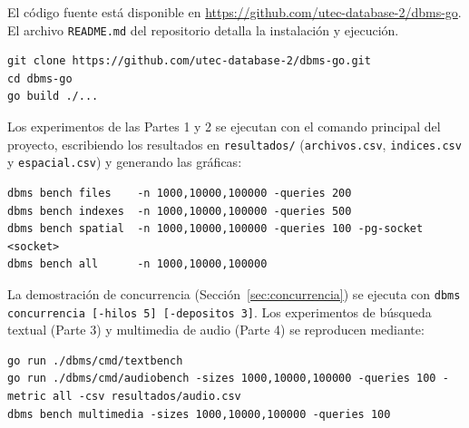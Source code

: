 \documentclass[11pt,a4paper]{article}
\begin{document}
El código fuente está disponible en \url{https://github.com/utec-database-2/dbms-go}. El archivo \texttt{README.md} del repositorio detalla la instalación y ejecución.

\begin{lstlisting}
git clone https://github.com/utec-database-2/dbms-go.git
cd dbms-go
go build ./...
\end{lstlisting}

Los experimentos de las Partes 1 y 2 se ejecutan con el comando principal del proyecto, escribiendo los resultados en \texttt{resultados/} (\texttt{archivos.csv}, \texttt{indices.csv} y \texttt{espacial.csv}) y generando las gráficas:

\begin{lstlisting}
dbms bench files    -n 1000,10000,100000 -queries 200
dbms bench indexes  -n 1000,10000,100000 -queries 500
dbms bench spatial  -n 1000,10000,100000 -queries 100 -pg-socket <socket>
dbms bench all      -n 1000,10000,100000
\end{lstlisting}

La demostración de concurrencia (Sección~\ref{sec:concurrencia}) se ejecuta con \texttt{dbms concurrencia [-hilos 5] [-depositos 3]}. Los experimentos de búsqueda textual (Parte 3) y multimedia de audio (Parte 4) se reproducen mediante:

\begin{lstlisting}
go run ./dbms/cmd/textbench
go run ./dbms/cmd/audiobench -sizes 1000,10000,100000 -queries 100 -metric all -csv resultados/audio.csv
dbms bench multimedia -sizes 1000,10000,100000 -queries 100
\end{lstlisting}
\end{document}
